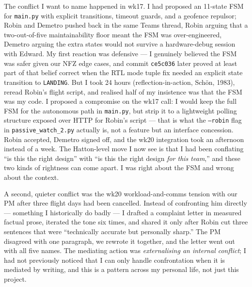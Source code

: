 The conflict I want to name happened in wk17. I had proposed an 11-state FSM for \texttt{main.py} with explicit transitions, timeout guards, and a geofence repulsor; Robin and Demetro pushed back in the same Teams thread, Robin arguing that a two-out-of-five maintainability floor meant the FSM was over-engineered, Demetro arguing the extra states would not survive a hardware-debug session with Edward. My first reaction was defensive --- I genuinely believed the FSM was safer given our NFZ edge cases, and commit \texttt{ce5c036} later proved at least part of that belief correct when the RTL mode tuple fix needed an explicit state transition to \texttt{LANDING}. But I took 24 hours (reflection-in-action, Sch\"on, 1983), reread Robin's flight script, and realised half of my insistence was that the FSM was my code. I proposed a compromise on the wk17 call: I would keep the full FSM for the autonomous path in \texttt{main.py}, but strip it to a lightweight polling structure exposed over HTTP for Robin's script --- that is what the \texttt{--robin} flag in \texttt{passive\_watch\_2.py} actually is, not a feature but an interface concession. Robin accepted, Demetro signed off, and the wk20 integration took an afternoon instead of a week. The Hatton-level move I now see is that I had been conflating ``is this the right design'' with ``is this the right design \emph{for this team},'' and these two kinds of rightness can come apart. I was right about the FSM and wrong about the context.

A second, quieter conflict was the wk20 workload-and-comms tension with our PM after three flight days had been cancelled. Instead of confronting him directly --- something I historically do badly --- I drafted a complaint letter in measured factual prose, iterated the tone six times, and shared it only after Robin cut three sentences that were ``technically accurate but personally sharp.'' The PM disagreed with one paragraph, we rewrote it together, and the letter went out with all five names. The mediating action was \emph{externalising an internal conflict}; I had not previously noticed that I can only handle confrontation when it is mediated by writing, and this is a pattern across my personal life, not just this project.


